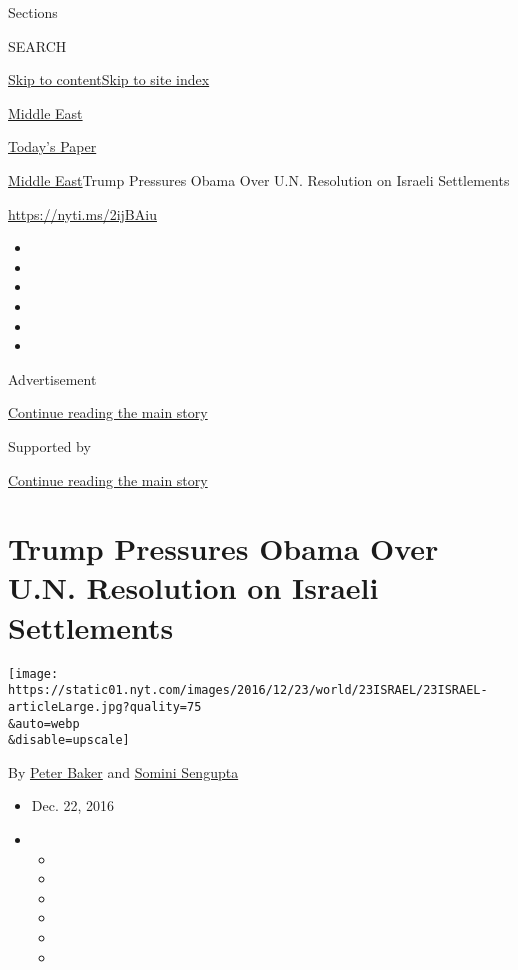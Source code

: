 Sections

SEARCH

\protect\hyperlink{site-content}{Skip to
content}\protect\hyperlink{site-index}{Skip to site index}

\href{https://www.nytimes.com/section/world/middleeast}{Middle East}

\href{https://myaccount.nytimes.com/auth/login?response_type=cookie\&client_id=vi}{}

\href{https://www.nytimes.com/section/todayspaper}{Today's Paper}

\href{/section/world/middleeast}{Middle East}\textbar{}Trump Pressures
Obama Over U.N. Resolution on Israeli Settlements

\url{https://nyti.ms/2ijBAiu}

\begin{itemize}
\item
\item
\item
\item
\item
\item
\end{itemize}

Advertisement

\protect\hyperlink{after-top}{Continue reading the main story}

Supported by

\protect\hyperlink{after-sponsor}{Continue reading the main story}

\hypertarget{trump-pressures-obama-over-un-resolution-on-israeli-settlements}{%
\section{Trump Pressures Obama Over U.N. Resolution on Israeli
Settlements}\label{trump-pressures-obama-over-un-resolution-on-israeli-settlements}}

\texttt{[image: https://static01.nyt.com/images/2016/12/23/world/23ISRAEL/23ISRAEL-articleLarge.jpg?quality=75\\\&auto=webp\\\&disable=upscale]}

By \href{http://www.nytimes.com/by/peter-baker}{Peter Baker} and
\href{http://www.nytimes.com/by/somini-sengupta}{Somini Sengupta}

\begin{itemize}
\item
  Dec. 22, 2016
\item
  \begin{itemize}
  \item
  \item
  \item
  \item
  \item
  \item
  \end{itemize}
\end{itemize}

